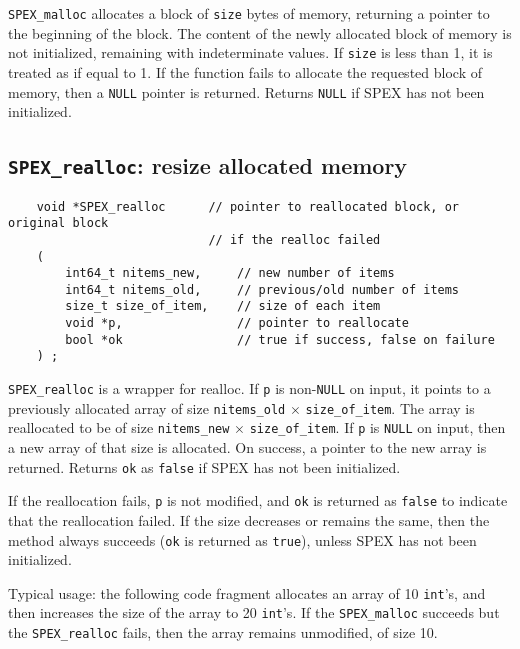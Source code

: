 \documentclass[12pt]{report}
\theoremstyle{definition}
\begin{document}
\verb|SPEX_malloc| allocates a block of \verb|size| bytes of memory, returning
a pointer to the beginning of the block. The content of the newly allocated
block of memory is not initialized, remaining with indeterminate values.
If \verb|size| is less than 1, it is treated as if equal to 1. If the function
fails to allocate the requested block of memory, then a \verb|NULL| pointer is
returned.
Returns \verb|NULL| if SPEX has not been initialized.

\cprotect\subsection{\verb|SPEX_realloc|: resize allocated memory}
\label{ss:SPEX_realloc}

\begin{mdframed}[userdefinedwidth=6in]
{\footnotesize
\begin{verbatim}
    void *SPEX_realloc      // pointer to reallocated block, or original block
                            // if the realloc failed
    (
        int64_t nitems_new,     // new number of items
        int64_t nitems_old,     // previous/old number of items
        size_t size_of_item,    // size of each item
        void *p,                // pointer to reallocate
        bool *ok                // true if success, false on failure
    ) ;
\end{verbatim}
} \end{mdframed}

\verb|SPEX_realloc| is a wrapper for realloc.  If \verb|p| is non-\verb|NULL| on
input, it points to a previously allocated array of size \verb|nitems_old|
$\times$ \verb|size_of_item|.  The array is reallocated to be of size
\verb|nitems_new| $\times$ \verb|size_of_item|.  If \verb|p| is \verb|NULL| on input,
then a new array of that size is allocated.  On success, a pointer to the new
array is returned.  Returns \verb|ok| as \verb|false| if SPEX has not been
initialized.

If the reallocation fails, \verb|p| is not modified, and \verb|ok| is returned
as \verb|false| to indicate that the reallocation failed.  If the size
decreases or remains the same, then the method always succeeds (\verb|ok| is
returned as \verb|true|), unless SPEX has not been initialized.

Typical usage:  the following code fragment allocates an array of 10
\verb|int|'s, and then increases the size of the array to 20 \verb|int|'s.  If
the \verb|SPEX_malloc| succeeds but the \verb|SPEX_realloc| fails, then the
array remains unmodified, of size 10.
\end{document}
